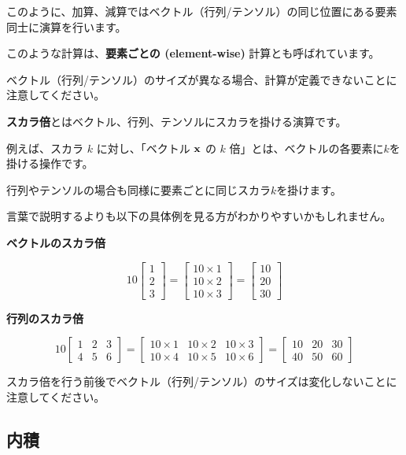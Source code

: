このように、加算、減算ではベクトル（行列/テンソル）の同じ位置にある要素同士に演算を行います。

このような計算は、\textbf{要素ごとの (element-wise)} 計算とも呼ばれています。

ベクトル（行列/テンソル）のサイズが異なる場合、計算が定義できないことに注意してください。


\textbf{スカラ倍}とはベクトル、行列、テンソルにスカラを掛ける演算です。

例えば、スカラ $k$ に対し、「ベクトル ${\bf x}$ の $k$ 倍」とは、ベクトルの各要素に$k$を掛ける操作です。

行列やテンソルの場合も同様に要素ごとに同じスカラ$k$を掛けます。

言葉で説明するよりも以下の具体例を見る方がわかりやすいかもしれません。



\textbf{ベクトルのスカラ倍}

\[
10
\begin{bmatrix}
1 \\
2 \\
3
\end{bmatrix}=\begin{bmatrix}
10 \times 1 \\
10 \times 2 \\
10 \times 3
\end{bmatrix}=\begin{bmatrix}
10 \\
20 \\
30
\end{bmatrix}
\]


\textbf{行列のスカラ倍}

\[
10
\begin{bmatrix}
1 & 2 & 3 \\
4 & 5 & 6
\end{bmatrix}=\begin{bmatrix}
10 \times 1 & 10 \times 2 & 10 \times 3 \\
10 \times 4 & 10 \times 5 & 10 \times 6
\end{bmatrix}=\begin{bmatrix}
10 & 20 & 30 \\
40 & 50 & 60
\end{bmatrix}
\]


スカラ倍を行う前後でベクトル（行列/テンソル）のサイズは変化しないことに注意してください。


\subsection{内積}


